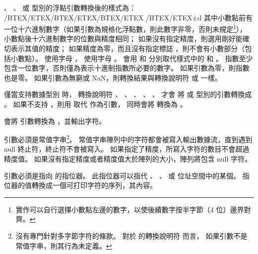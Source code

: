 {{
、 、 
 或  型別的浮點引數轉換後的樣式為：
\starttyping
		/BTEX\ftRef{[-]}/ETEX/BTEX/ETEX/BTEX/ETEX /BTEX/ETEX±d
\stoptyping
其中小數點前有一位十六進制數字（如果引數為規格化浮點數，則此數字非零，否則未規定\footnote{
實作可以自行選擇小數點左邊的數字，以使後續數字按半字節（4 位）邊界對齊。}），
小數點後十六進制數字的位數與精度相同；
如果沒有指定精度，則選用剛好能確切表示其值的精度；
如果精度為零，而且沒有指定標誌 \cemp{#}，則不會有小數部分（包括小數點）。
  使用字母 ，  使用字母 。
  會用  和  分別取代樣式中的  和 。
指數至少包含一位數字，否則僅為表示十進制指數所必要的數字。
如果引數為零，則指數也是零。
如果引數為無窮或 NaN，則轉換結果與轉換說明符  或  一樣。
\stopclSpecifier

\startnotepar
僅當支持數據型別  時，
轉換說明符 、 、 、 、 、  才會
將  或  型別的引數轉換成 。
如果不支持 ，則用  取代  作為引數，
同時會將  轉換為 。
\stopnotepar

會將  引數轉換為 ，並輸出字符。
\stopclSpecifier

引數必須是常值字串\footnote{
沒有專門針對多字節字符的條款。
對於  的轉換說明符  而言，
如果引數不是常值字串，則其行為未定義。}。
常值字串陣列中的字符都會被寫入輸出數據流，直到遇到 null 終止符，終止符不會被寫入。
如果指定了精度，所寫入字符的數目不會超過精度值。
如果沒有指定精度或者精度值大於陣列的大小，陣列將包含 null 字符\problem{}。
\stopclSpecifier

引數必須是指向  的指位器。
此指位器可以指代 、 、  或 
 位址空間中的某個。
指位器的值轉換成一個可打印字符的序列，其內容。
\stopclSpecifier

\startbuffer
\cemp{%
\stopbuffer
\startclSpecifier{\getbuffer}
直接輸出 \cemp{%
完整的轉換規約為 \cemp{%
\stopclSpecifier

如果轉換規約無效，其行為未定義。
如果任一轉換規約的對應引數型別不正確，其行為也是未定義的。

任何情況下，欄寬較小和欄位不存在都不會引起欄位的截斷；
如果轉換結果比欄寬寬，則會對此欄位進行擴充，以包含整個轉換結果。

}}}}}

